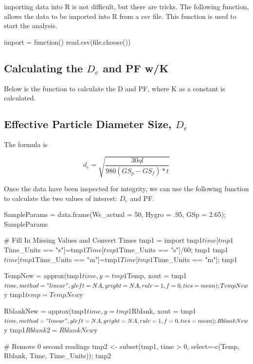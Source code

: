 \documentclass{tufte-handout}
\begin{document}
importing data into R is not difficult, but there are tricks. The following function, allows the data to be imported into R from a csv file. This function is used to start the analysis. 

\begin{Schunk}
\begin{Sinput}
 import = function(){
 read.csv(file.choose())
 }
\end{Sinput}
\end{Schunk}

\subsection{Calculating the $D_e$ and PF w/K}

Below is the function to calculate the D and PF, where K as a constant is calculated. 

\subsection{Effective Particle Diameter Size, $D_e$}

The formula is 

\begin{equation}
d_e = \sqrt{\frac{30 \eta l}{980 (GS_p - GS_f)* t}}
\end{equation}

Once the data have been inspected for integrity, we can use the following function to calculate the two values of interest: $D_e$ and PF. 


SampleParams = data.frame(Ws_actual = 50, Hygro = .95, GSp = 2.65); SampleParams

# Fill In Missing Values and Convert Times
tmp1 = import
tmp1$time[tmp1$Time_Units == "s"]=tmp1$Time[tmp1$Time_Units == "s"]/60; tmp1
tmp1$time[tmp1$Time_Units == "m"]=tmp1$Time[tmp1$Time_Units == "m"]; tmp1


TempNew = approx(tmp1$time, y = tmp1$Temp, xout = tmp1$time, method = "linear",
          yleft=NA, yright=NA, rule = 1, f = 0, ties = mean); TempNew$y
tmp1$temp = TempNew$y

RblankNew = approx(tmp1$time, y = tmp1$Rblank, xout = tmp1$time, method = "linear",
                 yleft=NA, yright=NA, rule = 1, f = 0, ties = mean); RblankNew$y
tmp1$Rblank2 = RblankNew$y

# Remove 0 second readings
tmp2 <- subset(tmp1, time > 0, select=-c(Temp, Rblank, Time, Time_Units)); tmp2
\end{document}
